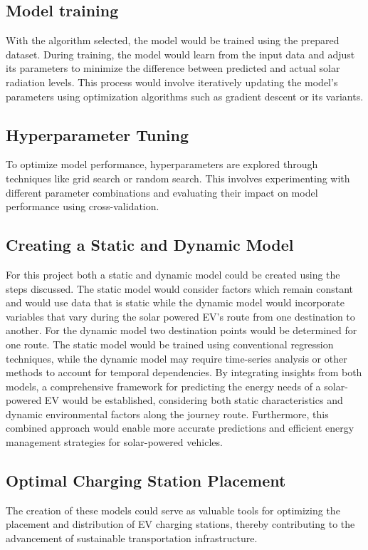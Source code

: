 \documentclass[10pt,twocolumn]{article}
\begin{document}
\subsection{Model training} With the algorithm selected, the model would be trained using the prepared dataset. During training, the model would learn from the input data and adjust its parameters to minimize the difference between predicted and actual solar radiation levels. This process would involve iteratively updating the model's parameters using optimization algorithms such as gradient descent or its variants.

\subsection{Hyperparameter Tuning}To optimize model performance, hyperparameters are explored through techniques like grid search or random search. This involves experimenting with different parameter combinations and evaluating their impact on model performance using cross-validation.
\subsection{Creating a Static and Dynamic Model}
For this project both a static and dynamic model could be created using the steps discussed. The static model would consider factors which remain constant and would use data that is static while the dynamic model would incorporate variables that vary during the solar powered EV's route from one destination to another. For the dynamic model two destination points would be determined for one route. The static model would be trained using conventional regression techniques, while the dynamic model may require time-series analysis or other methods to account for temporal dependencies. By integrating insights from both models, a comprehensive framework for predicting the energy needs of a solar-powered EV would be established, considering both static characteristics and dynamic environmental factors along the journey route. Furthermore, this combined approach would enable more accurate predictions and efficient energy management strategies for solar-powered vehicles. 
\subsection{Optimal Charging Station Placement}
The creation of these models could serve as valuable tools for optimizing the placement and distribution of EV charging stations, thereby contributing to the advancement of sustainable transportation infrastructure.
\end{document}
